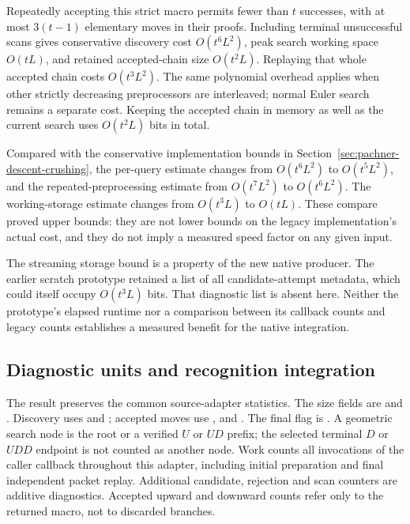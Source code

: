 Repeatedly accepting this strict macro permits fewer than $t$
successes, with at most $3(t-1)$ elementary moves in their proofs.
Including terminal unsuccessful scans gives conservative discovery
cost $O(t^6L^2)$, peak search working space $O(tL)$, and retained
accepted-chain size $O(t^2L)$.  Replaying that whole accepted chain
costs $O(t^3L^2)$.  The same polynomial overhead applies when other
strictly decreasing preprocessors are interleaved; normal Euler
search remains a separate cost.
Keeping the accepted chain in memory as well as the current search
uses $O(t^2L)$ bits in total.

Compared with the conservative implementation bounds in
Section~\ref{sec:pachner-descent-crushing}, the per-query estimate
changes from $O(t^6L^2)$ to $O(t^5L^2)$, and the repeated-preprocessing
estimate from $O(t^7L^2)$ to $O(t^6L^2)$.  The working-storage estimate
changes from $O(t^3L)$ to $O(tL)$.  These compare proved upper bounds:
they are not lower bounds on the legacy implementation's actual cost,
and they do not imply a measured speed factor on any given input.

The streaming storage bound is a property of the new native producer.
The earlier scratch prototype retained a list of all candidate-attempt
metadata, which could itself occupy $O(t^3L)$ bits.  That diagnostic
list is absent here.  Neither the prototype's elapsed runtime nor a
comparison between its callback counts and legacy counts establishes
a measured benefit for the native integration.

\subsection{Diagnostic units and recognition integration}

The result preserves the common source-adapter statistics.
The size fields are  and .
Discovery uses  and ; accepted moves
use ,  and .
The final flag is .  A geometric search node is the root or a
verified $U$ or $UD$ prefix; the selected terminal $D$ or $UDD$
endpoint is not counted as another node.  Work counts all invocations
of the caller callback throughout this adapter, including initial
preparation and final independent packet replay.  Additional candidate,
rejection and scan counters are additive diagnostics.  Accepted
upward and downward counts refer only to the returned macro, not to
discarded branches.

